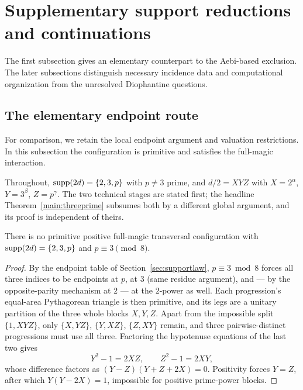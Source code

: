 \section{Supplementary support reductions and continuations}\label{app:supplementary}

The first subsection gives an elementary counterpart to the Aebi-based
exclusion. The later subsections distinguish necessary incidence data and
computational organization from the unresolved Diophantine questions.


\subsection{The elementary endpoint route}

For comparison, we retain the local endpoint argument and valuation
restrictions. In this subsection the configuration is primitive
and satisfies the full-magic interaction.

Throughout, $\operatorname{supp}(2d)=\{2,3,p\}$ with $p\neq3$ prime, and
$d/2=XYZ$ with $X=2^{\alpha}$, $Y=3^{\beta}$, $Z=p^{\gamma}$. The two
technical stages are stated first; the headline
Theorem~\ref{main:threeprime} subsumes both by a different global
argument, and its proof is independent of theirs.

\begin{proposition}\label{prop:threeblock}
There is no primitive positive full-magic transversal configuration with
$\operatorname{supp}(2d)=\{2,3,p\}$ and $p\equiv3\pmod8$.
\end{proposition}

\begin{proof}
By the endpoint table of Section~\ref{sec:supportlaw}, $p\equiv3\bmod8$
forces all three indices to be endpoints at $p$, at $3$ (same residue
argument), and --- by the opposite-parity mechanism at $2$ --- at the
$2$-power as well. Each progression's equal-area Pythagorean triangle is
then primitive, and its legs are a unitary partition of the three whole
blocks $X,Y,Z$. Apart from the impossible split $\{1,XYZ\}$, only
$\{X,YZ\}$, $\{Y,XZ\}$, $\{Z,XY\}$ remain, and three pairwise-distinct
progressions must use all three. Factoring the hypotenuse equations of the
last two gives
\[
Y^2-1=2XZ,\qquad Z^2-1=2XY ,
\]
whose difference factors as $(Y-Z)(Y+Z+2X)=0$. Positivity forces $Y=Z$,
after which $Y(Y-2X)=1$, impossible for positive prime-power blocks.
\end{proof}

